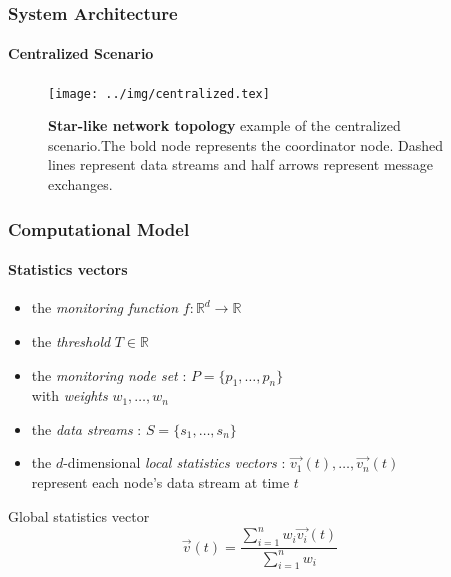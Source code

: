 \documentclass[hyperref={pdfpagelabels=false}]{beamer}
\begin{document}
\begin{frame} \frametitle{System Architecture} \framesubtitle{Centralized Scenario}
\begin{figure}[H]
\centering
\vspace{-1cm}
\texttt{[image: ../img/centralized.tex]}
\caption{\textbf{Star-like network topology} example of the centralized scenario.The bold node represents the coordinator node. Dashed lines represent data streams and half arrows represent message exchanges.} 
\end{figure}
\end{frame}

\begin{frame} \frametitle{Computational Model}\framesubtitle{Statistics vectors}

\begin{itemize}
\item the \emph{monitoring function} $f:\mathbb{R}^d \to \mathbb{R}$
\item the \emph{threshold} $T \in \mathbb{R}$
\item the \emph{monitoring node set} : $P=\{p_1, \dots, p_n\}$\\\quad with \emph{weights} $w_1, \dots, w_n$
\item the \emph{data streams} : $S=\{s_1, \dots, s_n\}$
\item the $d$-dimensional \emph{local statistics vectors} : $\vec{v_1}(t), \dots, \vec{v_n}(t)$\\\quad represent each node's data stream at time $t$
\end{itemize}
\begin{block}{Global statistics vector}
\vspace{0.2cm}
\begin{equation*}
\vec{v}(t)=\frac{\sum_{i=1}^n{w_i\vec{v_i}(t)}}{\sum_{i=1}^n{w_i}}
\end{equation*}
\vspace{0.2cm}
\end{block}
\end{frame}
\end{document}
